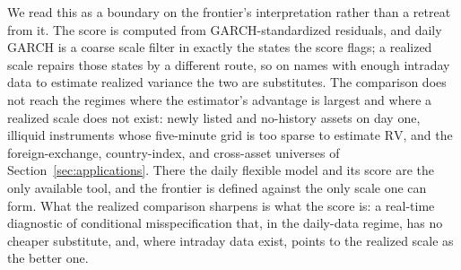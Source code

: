 \documentclass[11pt]{article}
\theoremstyle{remark}
\begin{document}
We read this as a boundary on the frontier's interpretation rather than a retreat
from it. The score is computed from GARCH-standardized residuals, and daily GARCH
is a coarse scale filter in exactly the states the score flags; a realized scale
repairs those states by a different route, so on names with enough intraday data
to estimate realized variance the two are substitutes. The comparison does not
reach the regimes where the estimator's advantage is largest and where a realized
scale does not exist: newly listed and no-history assets on day one, illiquid
instruments whose five-minute grid is too sparse to estimate $\mathrm{RV}$, and the
foreign-exchange, country-index, and cross-asset universes of
Section~\ref{sec:applications}. There the daily flexible model and its score are
the only available tool, and the frontier is defined against the only scale one
can form. What the realized comparison sharpens is what the score is: a real-time
diagnostic of conditional misspecification that, in the daily-data regime, has no
cheaper substitute, and, where intraday data exist, points to the realized scale
as the better one.
\end{document}
